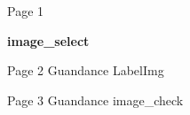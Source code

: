 Page 1
\begin{DoxyItemize}
\item {\bfseries image\+\_\+select}
\end{DoxyItemize}

Page 2 Guandance Label\+Img

Page 3 Guandance image\+\_\+check

\section*{}